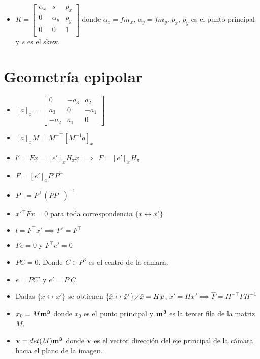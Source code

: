 \documentclass[12pt,a4paper]{article}
\begin{document}
\begin{itemize}
	\item $
	K = \left[ {\begin{smallmatrix}
		\alpha_{x} & s & p_{x}\\ 
	    0 & \alpha_{y} & p_{y}\\
	    0 & 0 & 1\\
	\end{smallmatrix} } \right]
	$ donde $\alpha_{x} = f m_{x}$, $\alpha_{y} = f m_{y}$. $p_{x}$, $p_{y}$ es el punto principal y $s$ es el skew.

\end{itemize}


\section{Geometr\'ia epipolar}

\begin{itemize}
	\item $[a]_{x} = \left[ {\begin{smallmatrix}
		0 & -a_3 & a_2\\ 
		a_3  & 0 & -a_1\\
		-a_2 & a_1 & 0
		\end{smallmatrix} } \right] $

	\item $[a]_{x}M = M^{-\top}[M^{-1}a]_{x}$

	\item $l' = Fx = [e']_{x} H_{\pi} x$ $\implies$ $F = [e']_{x} H_{\pi}$

	\item $F = [e']_{x} P' P^{+}$

	\item $P^{+} = P^{\top}(PP^{\top})^{-1}$

	\item ${x'}{}^{\top}Fx =0$ para toda correspondencia $\{x \leftrightarrow x' \}$

	\item $l = F^{\top}x' \implies F' = F^{\top}$

	\item $Fe = 0$ y $F^{\top}e' = 0$

	\item $PC = 0$. Donde $C \in P^{3}$ es el centro de la camara.

	\item $e = PC'$ y $e' = P'C$

	\item Dadas $\{x \leftrightarrow x' \}$ se obtienen  $\{\hat{x} \leftrightarrow \hat{x}' \} \diagup \hat{x} = Hx$, $\hat{x}'=Hx'  \implies \hat{F} = H^{-\top}FH^{-1}$
	
	\item $x_{0} = M{\bf m^{3}}$ donde $x_{0}$ es el punto principal y ${\bf m^{3}}$ es la tercer fila de la matriz $M$.
	
	\item ${\bf v}= det(M){\bf m^{3}}$ donde ${\bf v}$ es el vector direcci\'on del eje principal de la c\'amara hacia el plano de la imagen.

\end{itemize}
\end{document}
